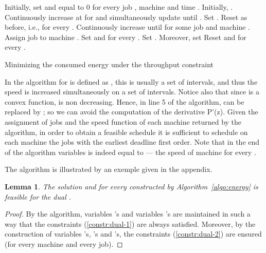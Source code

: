 \documentclass[11pt,a4paper]{article}
\newtheorem{lemma}{Lemma}
\begin{document}
\begin{algorithm}[H]
\begin{algorithmic}[1] 
\STATE Initially, set  and  equal to 0
	for every job , machine  and time .
\STATE Initially, .
\WHILE{}
		\STATE Continuously increase  at   for 
			and simultaneously update 
			until .
		\STATE Set .
		\STATE Reset  as before, i.e.,  for every .
	\ENDFOR 
	\STATE Continuously increase  until
		 for some job  
		and machine .
	\STATE Assign job  to machine . Set  and 
		for every .
	\STATE Set . Moreover, set 
	\STATE Reset  and  for every .
\ENDWHILE
\end{algorithmic}
\caption{Minimizing the consumed energy under the throughput constraint}
\label{algo:energy}
\end{algorithm}

In the algorithm  for  is defined as , this is usually a
set of intervals, and thus the speed  is increased simultaneously on a set of intervals.
Notice also that since  is a convex function,   is non decreasing. Hence, in line 5 of the algorithm,
 can be replaced by ; so we can avoid the computation of 
the derivative P'(z).
Given the assignment of jobs and the speed function  of each machine  returned by the algorithm, in order to obtain a feasible schedule it is sufficient to schedule on each machine the jobs with the earliest deadline first order.
Note that in the end of the algorithm variables  is indeed equal to 
 --- the speed of machine  for every . 

The algorithm is illustrated by an exemple given in the appendix. 

\begin{lemma}		\label{lem:approx-feasible}
The solution  and  for every  constructed 
by Algorithm~\ref{algo:energy} is feasible for the dual . 
\end{lemma}
\begin{proof}
By the algorithm, variables 's and variables 's are maintained 
in such a way that the constraints (\ref{constr:dual-1}) are always satisfied. 
Moreover, by the construction of variables 
's, 's and 's, the constraints
(\ref{constr:dual-2}) are ensured (for every machine and every job).  
\end{proof}
\end{document}

